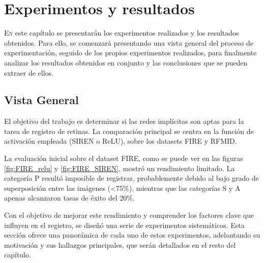 \chapter{Experimentos y resultados}
\label{chap:Experimentos e resultados}
\lettrine{E}{n} este capítulo se presentarán los experimentos realizados y los resultados obtenidos.
Para ello, se comenzará presentando una vista general del proceso de experimentación,
seguido de los propios experimentos realizados, para finalmente analizar los resultados obtenidos en conjunto y las conclusiones que se pueden extraer de ellos.

\section{Vista General}
\label{sec:Vista Xeral}

El objetivo del trabajo es determinar si las redes implícitas son aptas para la tarea de registro de retinas. La comparación principal se centra en la función de activación empleada (SIREN o ReLU), sobre los datasets FIRE y RFMID.

La evaluación inicial sobre el dataset FIRE, como se puede ver en las figuras \ref{fig:FIRE_relu} y \ref{fig:FIRE_SIREN}, mostró un rendimiento limitado. La categoría P resultó imposible de registrar, probablemente debido al bajo grado de superposición entre las imágenes (<75\%), mientras que las categorías S y A apenas alcanzaron tasas de éxito del 20\%.

Con el objetivo de mejorar este rendimiento y comprender los factores clave que influyen en el registro, se diseñó una serie de experimentos sistemáticos. Esta sección ofrece una panorámica de cada uno de estos experimentos, adelantando su motivación y sus hallazgos principales, que serán detallados en el resto del capítulo.

